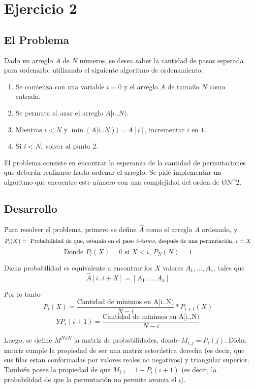 \section{Ejercicio 2}
\subsection{El Problema}

Dado un arreglo $A$ de $N$ números, se desea saber la cantidad de pasos esperada para ordenarlo, utilizando el siguiente algoritmo de ordenamiento:
\begin{enumerate}
	\item Se comienza con una variable $i = 0$ y el arreglo $A$ de tamaño $N$ como entrada.
	\item Se permuta al azar el arreglo $A[i..N)$.
	\item Mientras $i < N$ y $\min(A[i..N)) = A[i]$, incrementar $i$ en $1$.
	\item Si $i < N$, volver al punto 2.
\end{enumerate}

El problema consiste en encontrar la esperanza de la cantidad de permutaciones que deberán realizarse hasta ordenar el arreglo. Se pide implementar un algoritmo que encuentre este número con una complejidad del orden de \O{N^2}.

\subsection{Desarrollo}
Para resolver el problema, primero se define $\widehat{A}$ como el arreglo $A$ ordenado, y
	 \[ P_i(X) = \text{ Probabilidad de que, estando en el paso \emph{i-ésimo}, después de una permutación, }i=X \]
 	 \[ \text{Donde }P_i(X) = 0\text{ si }X < i\text{, }P_N(N) = 1\]

Dicha probabilidad es equivalente a encontrar los $X$ valores $A_1,...,A_x$, tales que 
 \[ \widehat{A}[i..i+X] = [A_1,...,A_x] \]
 
Por lo tanto
\[ P_i(X) = \frac{\text{Cantidad de mínimos en A[i..N)}}{N-i} * P_{i+1}(X) \]
\[ Y P_i(i+1) = \frac{\text{Cantidad de mínimos en A[i..N)}}{N-i}\]

Luego, se define $M^{NxN}$ la matriz de probabilidades, donde $M_{i,j} = P_i(j)$.
Dicha matriz cumple la propiedad de ser una matriz estocástica derecha (es decir, que sus filas estan conformadas por valores reales no negativos) y triangular superior.
También posee la propiedad de que $M_{i,i} = 1 - P_i(i+1)$ (es decir, la probabilidad de que la permutación no permite avanza el $i$).\\

